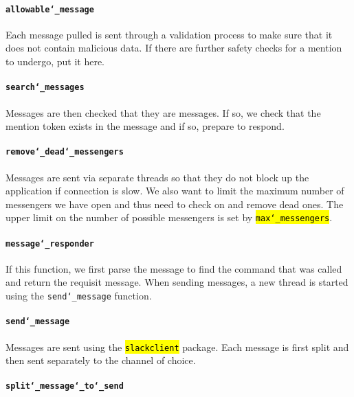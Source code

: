 \documentclass{article}
\newcommand{\un}[0]{\char`_}
\newcommand{\code}[1]{\textcolor{red}{\hl{\texttt{#1}}}}
\begin{document}
\paragraph{\texttt{allowable\un message}}

Each message pulled is sent through a validation process to make sure that it does not contain malicious data. If there are further safety checks for a mention to undergo, put it here.

\paragraph{\texttt{search\un messages}}

Messages are then checked that they are messages. If so, we check that the mention token exists in the message and if so, prepare to respond.

\paragraph{\texttt{remove\un dead\un messengers}}

Messages are sent via separate threads so that they do not block up the application if connection is slow. We also want to limit the maximum number of messengers we have open and thus need to check on and remove dead ones. The upper limit on the number of possible messengers is set by \code{max\un messengers}.

\paragraph{\texttt{message\un responder}}

If this function, we first parse the message to find the command that was called and return the requisit message. When sending messages, a new thread is started using the \texttt{send\un message} function.

\paragraph{\texttt{send\un message}}

Messages are sent using the \code{slackclient} package. Each message is first split and then sent separately to the channel of choice. 

\paragraph{\texttt{split\un message\un to\un send}}
\end{document}
